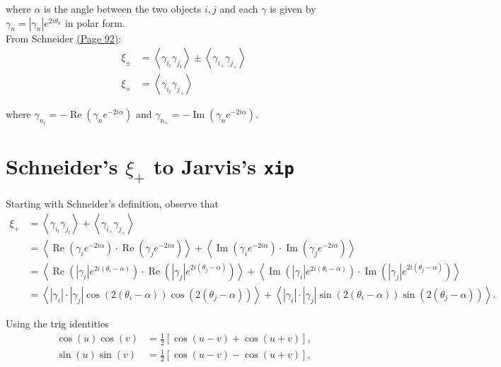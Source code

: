 \documentclass[%
 reprint,
 amsmath,amssymb,
 aps,
]{revtex4-1}
\begin{document}
where $\alpha$ is the angle between the two objects $i,j$ and each $\gamma$ is given by $\gamma_n=|\gamma_n|e^{2i\theta_n}$ in polar form.\\

From Schneider \href{http://arxiv.org/pdf/astro-ph/0509252v1.pdf}{(Page 92)}:
\begin{align}
\xi_\pm&=\left<\gamma_{i_t}\gamma_{j_t}\right>\pm\left<\gamma_{i_\times}\gamma_{j_\times}\right>\label{s+-}\\
\xi_\times&=\left<\gamma_{i_t}\gamma_{j_\times}\right>\label{sx}
\end{align}

where $\gamma_{n_t}=-\operatorname{Re}\left(\gamma_n e^{-2i\alpha}\right)$ and $\gamma_{n_\times}=-\operatorname{Im}\left(\gamma_n e^{-2i\alpha}\right)$.\\

\section*{Schneider's $\xi_+$ to Jarvis's \texttt{xip}}

Starting with Schneider's definition, observe that
\begin{align*}
\xi_+&=\left<\gamma_{i_t}\gamma_{j_t}\right>+\left<\gamma_{i_\times}\gamma_{j_\times}\right>\\
&=\left<\operatorname{Re}\left(\gamma_ie^{-2i\alpha}\right)\cdot\operatorname{Re}\left(\gamma_je^{-2i\alpha}\right)\right>+\left<\operatorname{Im}\left(\gamma_ie^{-2i\alpha}\right)\cdot\operatorname{Im}\left(\gamma_je^{-2i\alpha}\right)\right>\\
&=\left<\operatorname{Re}\left(|\gamma_i|e^{2i(\theta_i-\alpha)}\right)\cdot\operatorname{Re}\left(|\gamma_j|e^{2i(\theta_j-\alpha)}\right)\right>+\left<\operatorname{Im}\left(|\gamma_i|e^{2i(\theta_i-\alpha)}\right)\cdot\operatorname{Im}\left(|\gamma_j|e^{2i(\theta_j-\alpha)}\right)\right>\\
&=\left<|\gamma_i|\cdot|\gamma_j|\cos\left(2(\theta_i-\alpha)\right)\cos\left(2(\theta_j-\alpha)\right)\right>+\left<|\gamma_i|\cdot|\gamma_j|\sin\left(2(\theta_i-\alpha)\right)\sin\left(2(\theta_j-\alpha)\right)\right>.
\end{align*}

Using the trig identities
\begin{align}
\cos(u)\cos(v)&=\frac{1}{2}\left[\cos(u-v)+\cos(u+v)\right],\\
\sin(u)\sin(v)&=\frac{1}{2}\left[\cos(u-v)-\cos(u+v)\right],
\end{align}
\end{document}
